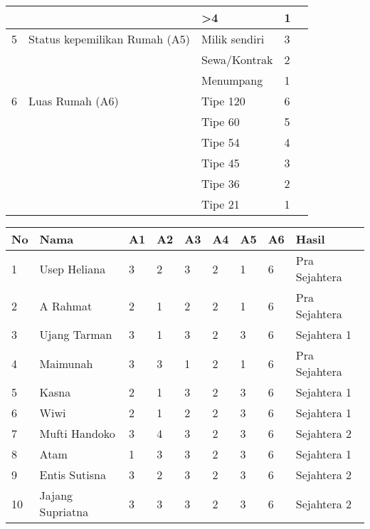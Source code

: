 \begin{enumerate}
\begin{table}[!ht]
\begin{tabular}{|l|l|l|l|l|}
   &                               & \textgreater{}4  & 1     &             \\ \hline
5  & Status kepemilikan Rumah (A5) & Milik sendiri    & 3     &             \\ \hline
   &                               & Sewa/Kontrak     & 2     &             \\ \hline
   &                               & Menumpang        & 1     &             \\ \hline
6  & Luas Rumah (A6)               & Tipe 120         & 6     &             \\ \hline
   &                               & Tipe 60          & 5     &             \\ \hline
   &                               & Tipe 54          & 4     &             \\ \hline
   &                               & Tipe 45          & 3     &             \\ \hline
   &                               & Tipe 36          & 2     &             \\ \hline
   &                               & Tipe 21          & 1     &             \\ \hline
\end{tabular}
\end{table}
    \begin{table}[!ht]
    \centering
\begin{tabular}{|l|l|l|l|l|l|l|l|l|}
\hline
No & Nama             & A1 & A2 & A3 & A4 & A5 & A6 & Hasil         \\ \hline
1  & Usep Heliana     & 3  & 2  & 3  & 2  & 1  & 6  & Pra Sejahtera \\ \hline
2  & A Rahmat         & 2  & 1  & 2  & 2  & 1  & 6  & Pra Sejahtera \\ \hline
3  & Ujang Tarman     & 3  & 1  & 3  & 2  & 3  & 6  & Sejahtera 1   \\ \hline
4  & Maimunah         & 3  & 3  & 1  & 2  & 1  & 6  & Pra Sejahtera \\ \hline
5  & Kasna            & 2  & 1  & 3  & 2  & 3  & 6  & Sejahtera 1   \\ \hline
6  & Wiwi             & 2  & 1  & 2  & 2  & 3  & 6  & Sejahtera 1   \\ \hline
7  & Mufti Handoko    & 3  & 4  & 3  & 2  & 3  & 6  & Sejahtera 2   \\ \hline
8  & Atam             & 1  & 3  & 3  & 2  & 3  & 6  & Sejahtera 1   \\ \hline
9  & Entis Sutisna    & 3  & 2  & 3  & 2  & 3  & 6  & Sejahtera 2   \\ \hline
10 & Jajang Supriatna & 3  & 3  & 3  & 2  & 3  & 6  & Sejahtera 2   \\ \hline
\end{tabular}
\end{table}
\end{enumerate}


